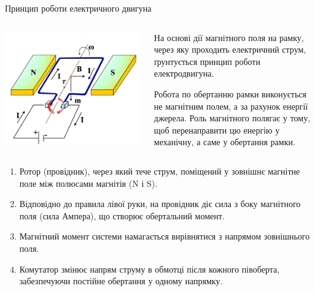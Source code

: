 \documentclass{beamer}
\begin{document}
\begin{frame}{Принцип роботи електричного двигуна}{}

	\begin{columns}
		\begin{column}{0.4\linewidth}\centering\scriptsize
			\includegraphics[width=1\linewidth]{motor}
		\end{column}
		\begin{column}{0.6\linewidth}
			\begin{block}{}\justifying
				На основі дії магнітного поля на рамку, через яку проходить електричний струм, ґрунтується принцип роботи електродвигуна.
			\end{block}
			\begin{alertblock}{}\justifying\small
				Робота по обертанню рамки виконується не магнітним полем, а за рахунок енергії джерела. Роль магнітного полягає у тому, щоб
				перенаправити цю енергію у механічну, а саме у обертання рамки.
			\end{alertblock}
		\end{column}
	\end{columns}
	\begin{block}{}\scriptsize
		\begin{enumerate}
			\item Ротор (провідник), через який тече струм, поміщений у зовнішнє магнітне поле між полюсами магнітів (N і S).
			\item Відповідно до правила лівої руки, на провідник діє сила з боку магнітного поля (сила Ампера), що створює обертальний момент.
			\item Магнітний момент системи намагається вирівнятися з напрямом зовнішнього поля.
			\item Комутатор змінює напрям струму в обмотці після кожного півоберта, забезпечуючи постійне обертання у одному напрямку.
		\end{enumerate}
	\end{block}
\end{frame}
\end{document}
